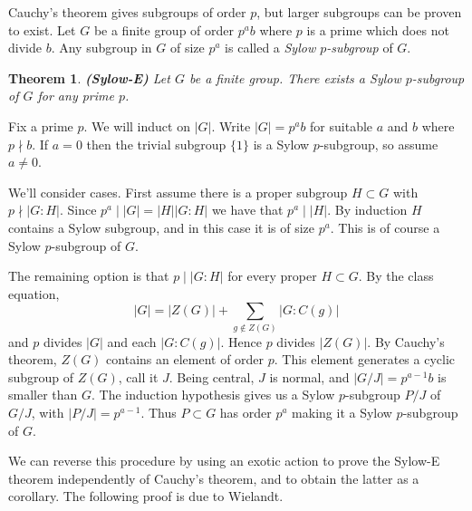 \documentclass[letterpaper]{article}
\newtheorem{theorem}{Theorem}[section]
\newenvironment{proof}[1][Proof]{\begin{trivlist}
\item[\hskip \labelsep {\bfseries #1}]}{\end{trivlist}}
\begin{document}
Cauchy's theorem gives subgroups of order $p$, but larger subgroups can be proven to exist. Let $G$ be a finite group of order $p^ab$ where $p$ is a prime which does not divide $b$. Any subgroup in $G$ of size $p^a$ is called a \emph{Sylow $p$-subgroup} of $G$.

\begin{theorem}
\emph{\textbf{(Sylow-E)}}
Let $G$ be a finite group. There exists a Sylow $p$-subgroup of $G$ for any prime $p$.
\end{theorem}
\begin{proof}
Fix a prime $p$. We will induct on $|G|$. Write $|G| = p^ab$ for suitable $a$ and $b$ where $p \nmid b$. If $a = 0$ then the trivial subgroup $\{1\}$ is a Sylow $p$-subgroup, so assume $a \neq 0$.

We'll consider cases. First assume there is a proper subgroup $H \subset G$ with $p \nmid |G : H|$. Since $p^a \mid |G| = |H||G : H|$ we have that $p^a \mid |H|$. By induction $H$ contains a Sylow subgroup, and in this case it is of size $p^a$. This is of course a Sylow $p$-subgroup of $G$.

The remaining option is that $p \mid |G : H|$ for every proper $H \subset G$. By the class equation,
\[|G| = |Z(G)| + \sum_{g \not \in Z(G)} |G \colon C(g)|\]
and $p$ divides $|G|$ and each $|G \colon C(g)|$. Hence $p$ divides $|Z(G)|$. By Cauchy's theorem, $Z(G)$ contains an element of order $p$. This element generates a cyclic subgroup of $Z(G)$, call it $J$. Being central, $J$ is normal, and $|G/J| = p^{a-1}b$ is smaller than $G$. The induction hypothesis gives us a Sylow $p$-subgroup $P/J$ of $G/J$, with $|P/J| = p^{a-1}$. Thus $P \subset G$ has order $p^a$ making it a Sylow $p$-subgroup of $G$.
\end{proof}

We can reverse this procedure by using an exotic action to prove the Sylow-E theorem independently of Cauchy's theorem, and to obtain the latter as a corollary. The following proof is due to Wielandt.
\end{document}
